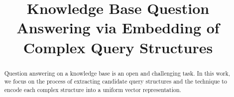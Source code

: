 \documentclass[10pt,conference,letterpaper]{IEEEtran}
\title{Knowledge Base Question Answering via Embedding of Complex Query Structures}
\begin{document}
\maketitle
%
\begin{abstract} 
Question answering on a knowledge base is an open and challenging task.
In this work, we focus on the process of extracting candidate query structures
and the technique to encode each complex structure into a uniform vector representation.
\end{abstract}

%




%








\end{document}
